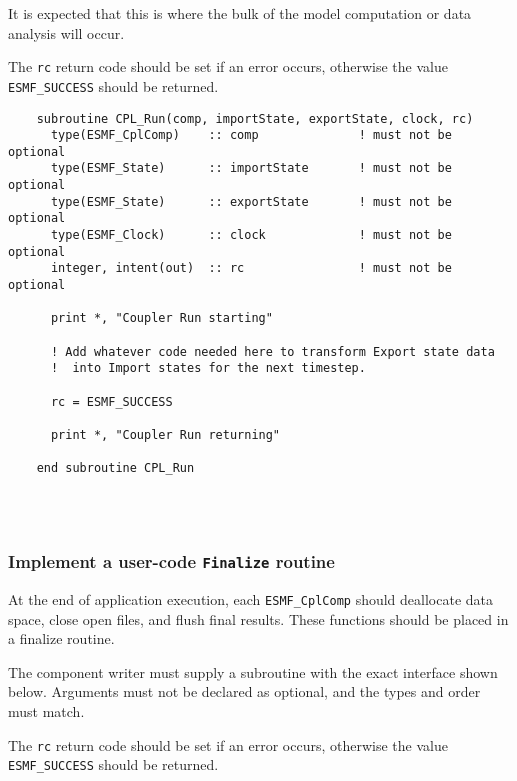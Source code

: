    It is expected that this is where the bulk of the model computation
   or data analysis will occur.
  
   The {\tt rc} return code should be set if an error occurs, otherwise
   the value {\tt ESMF\_SUCCESS} should be returned. 

 \begin{verbatim}
    subroutine CPL_Run(comp, importState, exportState, clock, rc)
      type(ESMF_CplComp)    :: comp              ! must not be optional
      type(ESMF_State)      :: importState       ! must not be optional
      type(ESMF_State)      :: exportState       ! must not be optional
      type(ESMF_Clock)      :: clock             ! must not be optional
      integer, intent(out)  :: rc                ! must not be optional

      print *, "Coupler Run starting"

      ! Add whatever code needed here to transform Export state data
      !  into Import states for the next timestep.  

      rc = ESMF_SUCCESS

      print *, "Coupler Run returning"

    end subroutine CPL_Run
 
\end{verbatim}
 
 
\mbox{}\hrulefill\ 
 

  \subsubsection{Implement a user-code {\tt Finalize} routine}
   
   \label{sec:CplFinalize}
  
   At the end of application execution, each {\tt ESMF\_CplComp} should
   deallocate data space, close open files, and flush final results.
   These functions should be placed in a finalize routine.
  
   The component writer must supply a subroutine with the exact interface 
   shown below. Arguments must not be declared as optional, and the types and
   order must match.
  
   The {\tt rc} return code should be set if an error occurs, otherwise
   the value {\tt ESMF\_SUCCESS} should be returned.
   

